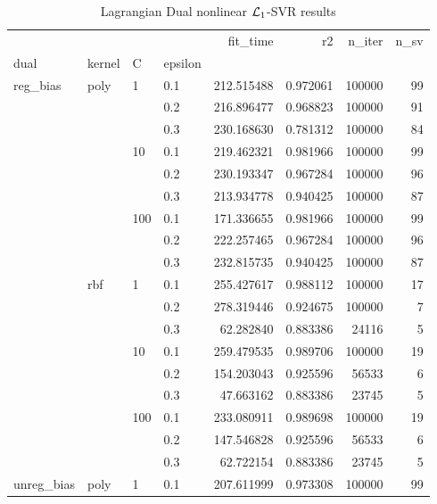 \begin{table}[H]
\centering
\caption{Lagrangian Dual nonlinear $\protect \mathcal{L}_1$-SVR results}
\label{nonlinear_lagrangian_dual_l1_svr_cv_results}
\begin{tabular}{llllrrrr}
\toprule
           &     &     &     &    fit\_time &        r2 &  n\_iter &  n\_sv \\
dual & kernel & C & epsilon &             &           &         &       \\
\midrule
reg\_bias & poly & 1   & 0.1 &  212.515488 &  0.972061 &  100000 &    99 \\
           &     &     & 0.2 &  216.896477 &  0.968823 &  100000 &    91 \\
           &     &     & 0.3 &  230.168630 &  0.781312 &  100000 &    84 \\
           &     & 10  & 0.1 &  219.462321 &  0.981966 &  100000 &    99 \\
           &     &     & 0.2 &  230.193347 &  0.967284 &  100000 &    96 \\
           &     &     & 0.3 &  213.934778 &  0.940425 &  100000 &    87 \\
           &     & 100 & 0.1 &  171.336655 &  0.981966 &  100000 &    99 \\
           &     &     & 0.2 &  222.257465 &  0.967284 &  100000 &    96 \\
           &     &     & 0.3 &  232.815735 &  0.940425 &  100000 &    87 \\
           & rbf & 1   & 0.1 &  255.427617 &  0.988112 &  100000 &    17 \\
           &     &     & 0.2 &  278.319446 &  0.924675 &  100000 &     7 \\
           &     &     & 0.3 &   62.282840 &  0.883386 &   24116 &     5 \\
           &     & 10  & 0.1 &  259.479535 &  0.989706 &  100000 &    19 \\
           &     &     & 0.2 &  154.203043 &  0.925596 &   56533 &     6 \\
           &     &     & 0.3 &   47.663162 &  0.883386 &   23745 &     5 \\
           &     & 100 & 0.1 &  233.080911 &  0.989698 &  100000 &    19 \\
           &     &     & 0.2 &  147.546828 &  0.925596 &   56533 &     6 \\
           &     &     & 0.3 &   62.722154 &  0.883386 &   23745 &     5 \\
unreg\_bias & poly & 1   & 0.1 &  207.611999 &  0.973308 &  100000 &    99 \\

\end{tabular}
\end{table}
